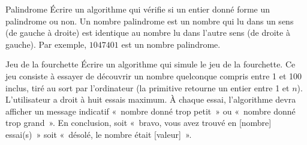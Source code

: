 	\begin{Exercice}{Palindrome}
		Écrire un algorithme qui vérifie si un entier donné 
		forme un palindrome ou non. 
		Un nombre palindrome est un nombre qui lu dans un sens 
		(de gauche à droite) est identique au nombre lu dans l’autre sens 
		(de droite à gauche). 
		Par exemple, $1047401$ est un nombre palindrome.
	\end{Exercice}
	
	\begin{Exercice}{Jeu de la fourchette}
		Écrire un algorithme qui simule le jeu de la
		fourchette. Ce jeu consiste à essayer de découvrir un nombre quelconque
		compris entre 1 et 100 inclus, tiré au sort par l’ordinateur (la primitive
		 retourne un entier entre 1 et $n$). 
		L’utilisateur a droit à huit essais
		maximum. À chaque essai, l’algorithme devra afficher un message
		indicatif «~nombre donné trop petit~» ou «~nombre donné trop grand~».
		En conclusion, soit «~bravo, vous avez trouvé en [nombre] essai(s)~» soit
		«~désolé, le nombre était [valeur]~».
	\end{Exercice}
	

